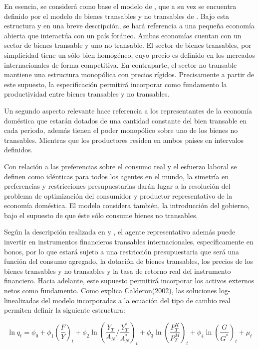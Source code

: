\documentclass[12pt,letterpaper]{article}
\begin{document}
En esencia, se considerá como base el modelo de \cite{Calderon2004exchange}, que a su vez se encuentra definido por el modelo de bienes transables y no transables de \cite{Obstfeld1995dynamics}. Bajo esta estructura y en una breve descripción, se hará referencia a una pequeña economía abierta que interactúa con un país foráneo. Ambas economías cuentan con un sector de bienes transable y uno no transable. El sector de bienes transables, por simplicidad tiene un sólo bien homogéneo, cuyo precio es definido en los mercados internacionales de forma competitiva. En contraparte, el sector no transable mantiene una estructura monopólica con precios rígidos. Precisamente a partir de este supuesto, la especificación permitirá incorporar como fundamento la productividad entre bienes transables y no transables. 

Un segundo aspecto relevante hace referencia a los representantes de la economía doméstica que estarán dotados de una cantidad constante del bien transable en cada periodo, además tienen el poder monopólico sobre uno de los bienes no transables. Mientras que los productores residen en ambos paises en intervalos definidos. 

Con relación a las preferencias sobre el consumo real y el esfuerzo laboral se definen como idénticas para todos los agentes en el mundo, la simetría en preferencias y restricciones presupuestarias darán lugar a la resolución del problema de optimización del consumidor y productor representativo de la economía doméstica. El modelo considera también, la introducción del gobierno, bajo el supuesto de que éste sólo consume bienes no transables.  

Según la descripción realizada en \cite{Calderon2002panel} y \cite{Calderon2004exchange}, el agente representativo además puede invertir en instrumentos financieros transables internacionales, específicamente en bonos, por lo que estará sujeto a una restricción presupuestaria que será una función del consumo agregado, la dotación de bienes transables, los precios de los bienes transables y no transables y la tasa de retorno real del instrumento financiero. Hacia adelante, este supuesto permitirá incorporar los activos externos netos como fundamento. Como explica Calderon(2002), las soluciones log-linealizadas del modelo incorporadas a la ecuación del tipo de cambio real permiten definir la siguiente estructura: 

\begin{equation}
\ln q_t=\phi_0+\phi_1\left(\frac{F}{Y}\right)_t+\phi_2\ln\left(\frac{Y_T}{A_N} / \frac{Y_T^*}{A_N^*}\right)_t+\phi_3\ln\left(\frac{P_T^X}{P_T^M}\right)_t+\phi_4\ln\left(\frac{G}{G^*}\right)_t+\mu_t
\end{equation}
\end{document}
